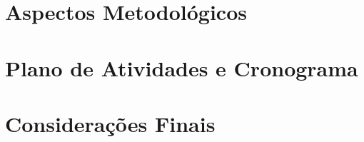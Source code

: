 \documentclass[projeto]{ufscar}
\begin{document}
\section{Aspectos Metodológicos}

\section{Plano de Atividades e Cronograma}

% 
\section{Considerações Finais}










\end{document}
